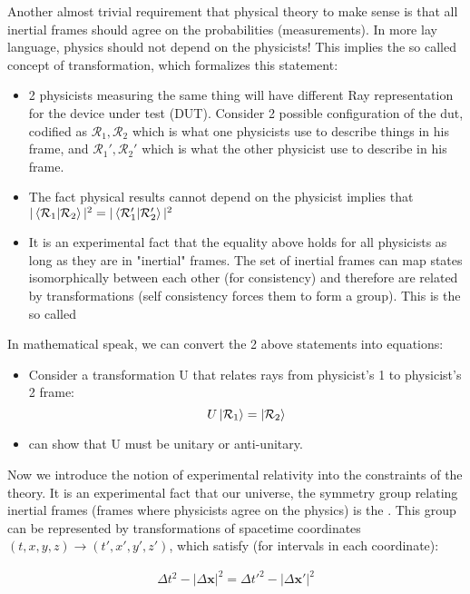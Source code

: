 \documentclass[12pt]{scrartcl}
\begin{document}
Another almost trivial requirement that physical theory to make sense is that all inertial frames should agree on the probabilities (measurements).  In more lay language, physics should not depend on the physicists!  This implies the so called concept of  transformation, which formalizes this statement:
\begin{itemize}
\item 2 physicists measuring the same thing will have different Ray representation for the device under test (DUT).  Consider 2 possible configuration of the dut, codified as $\mathcal{R}_1, \mathcal{R}_2$ which is what one physicists use to describe things in his frame, and ${\mathcal{R}_1'}, \mathcal{R}_2' $ which is what the other physicist use to describe in his frame.
\item The fact physical results cannot depend on the physicist implies that $|\braket{\mathcal{R}_1 | \mathcal{R}_2}|^2 = |\braket{\mathcal{R}_1' | \mathcal{R}_2'}|^2$
\item It is an experimental fact that the equality above  holds for all physicists as long as they are in "inertial" frames.  The set of inertial frames can map states isomorphically between each other (for consistency) and therefore are related by  transformations (self consistency forces them to form a group).  This is the so called 
\end{itemize}

In mathematical speak, we can convert the 2 above statements into equations:
\begin{itemize}
\item Consider a transformation U that relates rays from physicist's 1 to physicist's 2 frame:
$$ U \ket{\mathcal{R}_1} = \ket{\mathcal{R}_2}$$
\item  {} can show that U must be unitary or anti-unitary.
\end{itemize}

Now we introduce the notion of experimental relativity into the constraints of the theory.  It is an experimental fact that our universe, the symmetry group relating inertial frames (frames where physicists agree on the physics) is the .  This group can be represented by transformations of spacetime coordinates $(t, x, y, z) \rightarrow (t', x', y', z')$, which satisfy (for intervals in each coordinate):

\begin{align}
\Delta t^2 - |\Delta \mathbf{x}|^2 = \Delta t'^2 - |\Delta \mathbf{x'}|^2 
\end{align}
\end{document}
